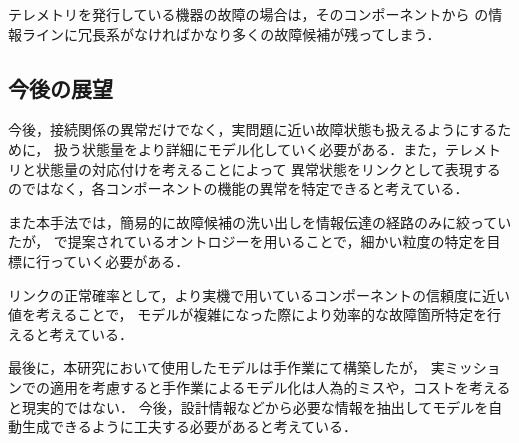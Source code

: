 \documentclass[11pt]{jsarticle}%
\begin{document}
\begin{multicols}{2}
  テレメトリを発行している機器の故障の場合は，そのコンポーネントから
  の情報ラインに冗長系がなければかなり多くの故障候補が残ってしまう．
  \subsection{今後の展望}
 今後，接続関係の異常だけでなく，実問題に近い故障状態も扱えるようにするために，
 扱う状態量をより詳細にモデル化していく必要がある．また，テレメトリと状態量の対応付けを考えることによって
 異常状態をリンクとして表現するのではなく，各コンポーネントの機能の異常を特定できると考えている．

 また本手法では，簡易的に故障候補の洗い出しを情報伝達の経路のみに絞っていたが，
 \cite{}で提案されているオントロジーを用いることで，細かい粒度の特定を目標に行っていく必要がある．

 リンクの正常確率として，より実機で用いているコンポーネントの信頼度に近い値を考えることで，
 モデルが複雑になった際により効率的な故障箇所特定を行えると考えている．

 最後に，本研究において使用したモデルは手作業にて構築したが，
 実ミッションでの適用を考慮すると手作業によるモデル化は人為的ミスや，コストを考えると現実的ではない．
 今後，設計情報などから必要な情報を抽出してモデルを自動生成できるように工夫する必要があると考えている．
  

  
   

\end{multicols}
\end{document}
